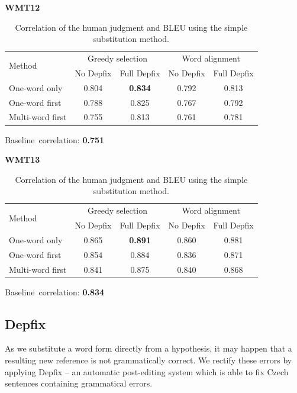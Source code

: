 \documentclass[11pt]{article}
\begin{document}
\begin{table}[tb]
\begin{center}

\textbf{WMT12}\\
\begin{tabular}{l|cc|cc}
\hline
\multirow{2}{*}{Method} & \multicolumn{2}{c|}{Greedy selection} & \multicolumn{2}{c}{Word alignment} \\
& No Depfix & Full Depfix  & No Depfix & Full Depfix \\
\hline
One-word only     & 0.804 & \textbf{0.834} & 0.792 & 0.813 \\
One-word first    & 0.788 & 0.825 & 0.767 & 0.792  \\
Multi-word first  & 0.755 & 0.813 & 0.761 & 0.781  \\
\end{tabular}

\vspace{10pt}
Baseline~correlation: \textbf{0.751}
\vspace{10pt}

\textbf{WMT13}\\
\begin{tabular}{l|cc|cc}
\hline
\multirow{2}{*}{Method} & \multicolumn{2}{c|}{Greedy selection} & \multicolumn{2}{c}{Word alignment} \\
& No Depfix & Full Depfix  & No Depfix & Full Depfix \\
\hline
One-word only     & 0.865 & \textbf{0.891} & 0.860 & 0.881  \\
One-word first    & 0.854 & 0.884  & 0.836 & 0.871 \\
Multi-word first  & 0.841 & 0.875  & 0.840 & 0.868  \\
\end{tabular}

\vspace{10pt}
Baseline~correlation: \textbf{0.834}
\caption{Correlation of the human judgment and BLEU using the simple substitution method.}
\label{lrec_results}
\end{center}
\end{table}

\subsection{Depfix}
As we substitute a word form directly from a hypothesis, it may happen that a 
resulting new reference is not grammatically correct. We rectify these errors 
by applying Depfix \cite{depfix} -- an automatic post-editing system which is 
able to fix Czech sentences containing grammatical errors.
\end{document}
